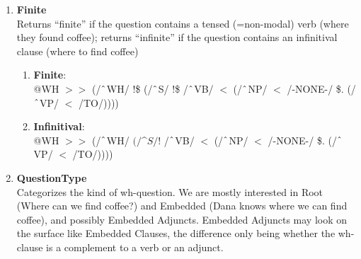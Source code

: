 \begin{enumerate}
\begin{enumerate}
        \end{enumerate}
    \item \textbf{Finite}\\
    Returns ``finite'' if the question contains a tensed (=non-modal) verb (\textsf{where they found coffee}); returns ``infinite'' if the question contains an infinitival clause (\textsf{where to find coffee})
        \begin{enumerate}
            \item \textbf{Finite}: \\
            @WH $>\!\!>$ (/$\string^$WH/ !\$ (/$\string^$S/ !\$ /$\string^$VB/ $<$ (/$\string^$NP/ $<$ /-NONE-/ \$. (/$\string^$VP/ $<$ /TO/))))
            \item \textbf{Infinitival}: \\
            @WH $>\!\!>$ (/$\string^$WH/ $ (/$\string^$S/ !$ /$\string^$VB/ $<$ (/$\string^$NP/ $<$ /-NONE-/ \$. (/$\string^$VP/ $<$ /TO/))))
        \end{enumerate}
    
    \item \textbf{QuestionType}\\
    Categorizes the kind of wh-question. We are mostly interested in Root (\textsf{Where can we find coffee?}) and Embedded (Dana knows where we can find coffee), and possibly Embedded Adjuncts. Embedded Adjuncts may look on the surface like Embedded Clauses, the difference only being whether the wh-clause is a complement to a verb or an adjunct. 


\end{enumerate}
